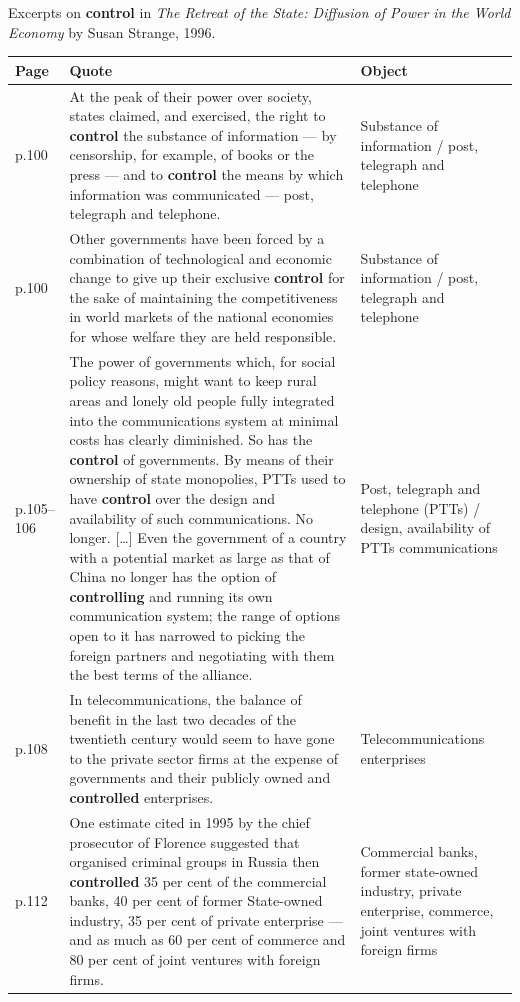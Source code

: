 Excerpts on \textbf{control} in \emph{The Retreat of the State: Diffusion of Power in the World Economy} by Susan Strange, 1996.

\small
\begin{longtable}{p{1.2cm} p{9.5cm} p{3.2cm}}
\toprule
\textbf{Page} & \textbf{Quote} & \textbf{Object} \\
\midrule
\endhead

p.100 & At the peak of their power over society, states claimed, and exercised, the right to \textbf{control} the substance of information --- by censorship, for example, of books or the press --- and to \textbf{control} the means by which information was communicated --- post, telegraph and telephone. & Substance of information / post, telegraph and telephone \\
\midrule

p.100 & Other governments have been forced by a combination of technological and economic change to give up their exclusive \textbf{control} for the sake of maintaining the competitiveness in world markets of the national economies for whose welfare they are held responsible. & Substance of information / post, telegraph and telephone \\
\midrule

p.105--106 & The power of governments which, for social policy reasons, might want to keep rural areas and lonely old people fully integrated into the communications system at minimal costs has clearly diminished. So has the \textbf{control} of governments. By means of their ownership of state monopolies, PTTs used to have \textbf{control} over the design and availability of such communications. No longer. {[}\ldots{]} Even the government of a country with a potential market as large as that of China no longer has the option of \textbf{controlling} and running its own communication system; the range of options open to it has narrowed to picking the foreign partners and negotiating with them the best terms of the alliance. & Post, telegraph and telephone (PTTs) / design, availability of PTTs communications \\
\midrule

p.108 & In telecommunications, the balance of benefit in the last two decades of the twentieth century would seem to have gone to the private sector firms at the expense of governments and their publicly owned and \textbf{controlled} enterprises. & Telecommunications enterprises \\
\midrule

p.112 & One estimate cited in 1995 by the chief prosecutor of Florence suggested that organised criminal groups in Russia then \textbf{controlled} 35 per cent of the commercial banks, 40 per cent of former State-owned industry, 35 per cent of private enterprise --- and as much as 60 per cent of commerce and 80 per cent of joint ventures with foreign firms. & Commercial banks, former state-owned industry, private enterprise, commerce, joint ventures with foreign firms \\
\midrule


\end{longtable}
